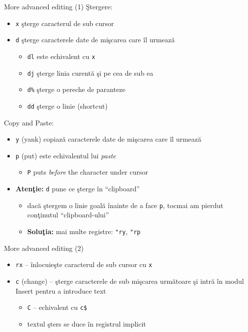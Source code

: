 \documentclass{beamer}
\begin{document}
\begin{frame}{More advanced editing (1)}
Ştergere:
\begin{itemize}
  \item<1-> \texttt{x} şterge caracterul de sub cursor
  \item<2-> \texttt{d} şterge caracterele date de mişcarea care îl urmează
    \begin{itemize}
    \item<3-> \texttt{dl} este echivalent cu \texttt{x}
    \item<4-> \texttt{dj} şterge linia curentă şi pe cea de sub ea
    \item<5-> \texttt{d\%} şterge o pereche de paranteze
    \item<6-> \texttt{dd} şterge o linie (shortcut)
    \end{itemize}
\end{itemize}

Copy and Paste:
\begin{itemize}
  \item<8-> \texttt{y} (yank) copiază caracterele date de mişcarea care îl urmează
  \item<9-> \texttt{p} (put) este echivalentul lui \textit{paste}
    \begin{itemize}
    \item<10-> \texttt{P} puts \textit{before} the character under cursor
    \end{itemize}
  \item<11-> \textbf{Atenţie:} \texttt{d} pune ce şterge în ``clipboard''
    \begin{itemize}
    \item<12-> dacă ştergem o linie goală înainte de a face \texttt{p}, tocmai
    am pierdut conţinutul ``clipboard-ului''
    \item<13-> \textbf{Soluţia:} mai multe registre: \texttt{"ry},
    \texttt{"rp}
    \end{itemize}
\end{itemize}
\end{frame}

\begin{frame}{More advanced editing (2)}
\begin{itemize}
  \item<1-> \texttt{rx} -- înlocuieşte caracterul de sub cursor cu \texttt{x}
  \item<2-> \texttt{c} (change) -- şterge caracterele de sub mişcarea
  următoare şi intră în modul Insert pentru a introduce text
    \begin{itemize}
    \item<3-> \texttt{C} -- echivalent cu \texttt{c\$}
    \item<4-> textul şters se duce în registrul implicit
    \end{itemize}
\end{itemize}
\end{frame}
\end{document}
